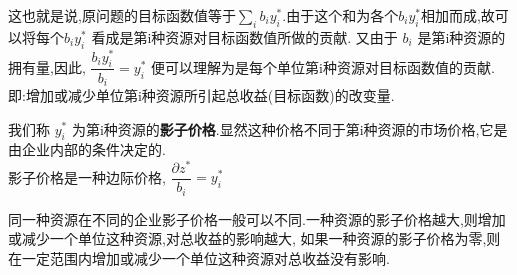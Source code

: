 这也就是说,原问题的目标函数值等于$\sum_i b_i y^*_i$.由于这个和为各个$b_i y^*_i$相加而成,故可以将每个$b_i y^*_i$ 看成是第i种资源对目标函数值所做的贡献.
又由于 $b_i$ 是第i种资源的拥有量,因此, $\dfrac{b_i y^*_i}{b_i} = y^*_i$ 便可以理解为是每个单位第i种资源对目标函数值的贡献.
即:增加或减少单位第i种资源所引起总收益(目标函数)的改变量.

我们称 $y^*_i$ 为第i种资源的\textbf{影子价格}.显然这种价格不同于第i种资源的市场价格,它是由企业内部的条件决定的.\\
影子价格是一种边际价格, $\dfrac{\partial z^*}{b_i} = y^*_i$

同一种资源在不同的企业影子价格一般可以不同.一种资源的影子价格越大,则增加或减少一个单位这种资源,对总收益的影响越大,
如果一种资源的影子价格为零,则在一定范围内增加或减少一个单位这种资源对总收益没有影响.

